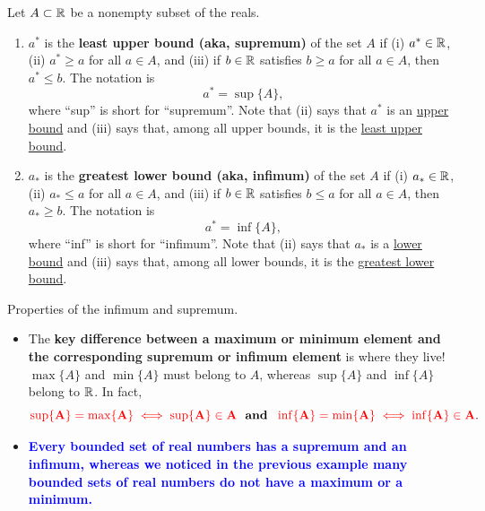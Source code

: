 \Qed

\bigskip

\begin{tcolorbox}[colback=mylightblue, title = {\bf Sup and Inf Values of a Set}, breakable]
\begin{definition}
\label{def:SupInfOfSets}
Let $A \subset \mathbb R$ be a nonempty subset of the reals.

\begin{enumerate}
\renewcommand{\labelenumi}{(\alph{enumi})}
\setlength{\itemsep}{.2cm}
    \item  $a^\ast$ is the \textbf{least upper bound (aka, supremum)} of the set $A$ if (i) $a^\ast \in \mathbb R$, (ii) $a^\ast \ge a$ for all $a \in A$, and (iii) if $b\in \mathbb R$ satisfies $b \ge a$ for all $a \in A$, then $a^\ast \le b$. The notation is
    $$a^\ast = \sup\{A\}, $$
    where ``sup'' is short for ``supremum''. Note that (ii) says that $a^\ast$ is an \ul{upper bound} and (iii) says that, among all upper bounds, it is the \ul{least upper bound}.

    \item  $a_\ast$ is the \textbf{greatest lower bound (aka, infimum)} of the set $A$ if (i) $a_\ast \in \mathbb R$, (ii) $a_\ast \le a$ for all $a \in A$, and (iii) if $b\in \mathbb R$ satisfies $b \le a$ for all $a \in A$, then $a_\ast \ge b$. The notation is
    $$a^\ast = \inf\{A\}, $$
    where ``inf'' is short for ``infimum''.  Note that (ii) says that $a_\ast$ is a \ul{lower bound} and (iii) says that, among all lower bounds, it is the \ul{greatest lower bound}.
\end{enumerate}

\end{definition}

\begin{rem} Properties of the infimum and supremum.
\begin{itemize}

    \item  The \textbf{key difference between a maximum or minimum element and the corresponding supremum or infimum element} is where they live! $\max\{A\}$ and $\min\{A\}$ must belong to $A$, whereas $\sup\{A\}$ and $ \inf\{A\}$ belong to $\mathbb R$. In fact,
    $$\mathcolor{red}{\bf \sup\{A\} =\max\{A\} \iff \sup\{A\} \in A ~~\textcolor{black}{ and } ~~  \inf\{A\} = \min\{A\} \iff \inf\{A\} \in A}.$$
    
    \item \textcolor{blue}{\bf Every bounded set of real numbers has a supremum and an infimum, whereas we noticed in the previous example many bounded sets of real numbers do not have a maximum or a minimum.}


\end{itemize}
\end{rem}
\end{tcolorbox}
